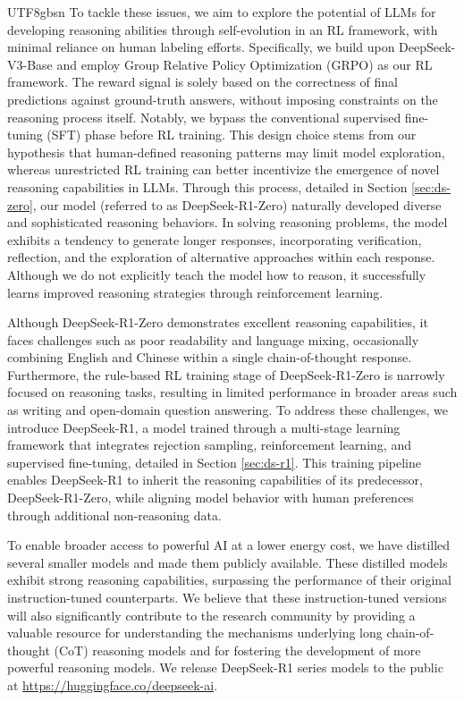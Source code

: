\documentclass[11pt, a4paper, logo, copyright, nonumbering]{deepseek}
\begin{document}
\begin{CJK*}{UTF8}{gbsn}
To tackle these issues, we aim to explore the potential of LLMs for developing reasoning abilities through self-evolution in an RL framework, with minimal reliance on human labeling efforts.
Specifically, we build upon DeepSeek-V3-Base \citep{dsviii} and employ Group Relative Policy Optimization (GRPO) \citep{deepseekmath} as our RL framework. The reward signal is solely based on the correctness of final predictions against ground-truth answers, without imposing constraints on the reasoning process itself. Notably, we bypass the conventional supervised fine-tuning (SFT) phase before RL training. This design choice stems from our hypothesis that human-defined reasoning patterns may limit model exploration, whereas unrestricted RL training can better incentivize the emergence of novel reasoning capabilities in LLMs. 
Through this process, detailed in Section \ref{sec:ds-zero}, our model (referred to as DeepSeek-R1-Zero) naturally developed diverse and sophisticated reasoning behaviors.
In solving reasoning problems, the model exhibits a tendency to generate longer responses, incorporating verification, reflection, and the exploration of alternative approaches within each response. Although we do not explicitly teach the model how to reason, it successfully learns improved reasoning strategies through reinforcement learning.

Although DeepSeek-R1-Zero demonstrates excellent reasoning capabilities, it faces challenges such as poor readability and language mixing, occasionally combining English and Chinese within a single chain-of-thought response. Furthermore, the rule-based RL training stage of DeepSeek-R1-Zero is narrowly focused on reasoning tasks, resulting in limited performance in broader areas such as writing and open-domain question answering.
To address these challenges, we introduce DeepSeek-R1, a model trained through a multi-stage learning framework that integrates rejection sampling, reinforcement learning, and supervised fine-tuning, detailed in Section \ref{sec:ds-r1}. This training pipeline enables DeepSeek-R1 to inherit the reasoning capabilities of its predecessor, DeepSeek-R1-Zero, while aligning model behavior with human preferences through additional non-reasoning data. 

To enable broader access to
 powerful AI at a lower energy cost, we have distilled several smaller models and made them publicly available. These distilled models exhibit strong reasoning capabilities, surpassing the performance of their original instruction-tuned counterparts. We believe that these instruction-tuned versions will also significantly contribute to the research community by providing a valuable resource for understanding the mechanisms underlying long chain-of-thought (CoT) reasoning models and for fostering the development of more powerful reasoning models. We release DeepSeek-R1 series  models to the public at \url{https://huggingface.co/deepseek-ai}. 


\end{CJK*}
\end{document}
